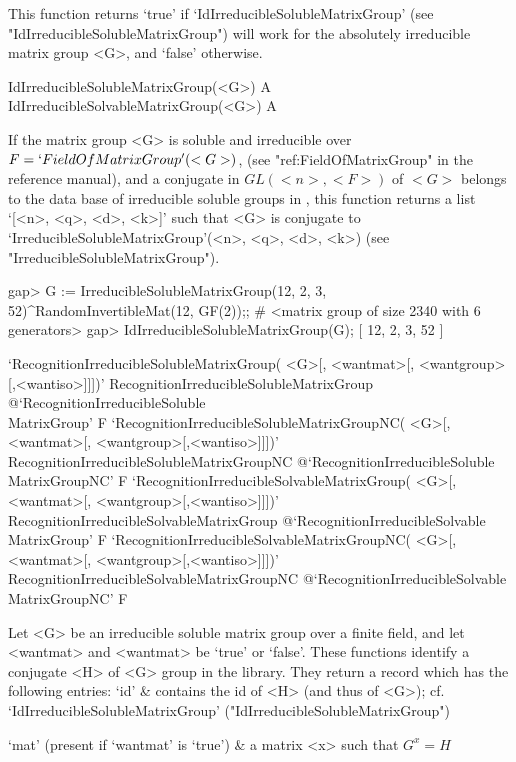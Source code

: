 This function returns `true' if `IdIrreducibleSolubleMatrixGroup' (see
"IdIrreducibleSolubleMatrixGroup") will work for the absolutely irreducible matrix group <G>, and `false' otherwise.


\>IdIrreducibleSolubleMatrixGroup(<G>) A
\>IdIrreducibleSolvableMatrixGroup(<G>) A

If the matrix group <G> is soluble and irreducible over $F
= `FieldOfMatrixGroup'(<G>)$, (see "ref:FieldOfMatrixGroup" in the {\GAP} reference manual), and a conjugate in
$GL(<n>, <F>)$ of $<G>$ belongs to the data base of  irreducible soluble groups in
{\IRREDSOL}, this function returns a list `[<n>, <q>, <d>, <k>]' such that <G> is
conjugate to  `IrreducibleSolubleMatrixGroup'(<n>, <q>, <d>, <k>) (see
"IrreducibleSolubleMatrixGroup").

\beginexample
gap> G := IrreducibleSolubleMatrixGroup(12, 2, 3, 52)^RandomInvertibleMat(12, GF(2));;
# <matrix group of size 2340 with 6 generators>
gap> IdIrreducibleSolubleMatrixGroup(G);
[ 12, 2, 3, 52 ]
\endexample


\>`RecognitionIrreducibleSolubleMatrixGroup(%
   <G>[, <wantmat>[, <wantgroup>[,<wantiso>]]])'%
{RecognitionIrreducibleSolubleMatrixGroup}%
@{`RecognitionIrreducibleSoluble\\MatrixGroup'} F
\>`RecognitionIrreducibleSolubleMatrixGroupNC(%
   <G>[, <wantmat>[, <wantgroup>[,<wantiso>]]])'%
{RecognitionIrreducibleSolubleMatrixGroupNC}%
@{`RecognitionIrreducibleSoluble\\MatrixGroupNC'} F
\>`RecognitionIrreducibleSolvableMatrixGroup(%
   <G>[, <wantmat>[, <wantgroup>[,<wantiso>]]])'%
{RecognitionIrreducibleSolvableMatrixGroup}%
@{`RecognitionIrreducibleSolvable\\MatrixGroup'} F
\>`RecognitionIrreducibleSolvableMatrixGroupNC(%
   <G>[, <wantmat>[, <wantgroup>[,<wantiso>]]])'%
{RecognitionIrreducibleSolvableMatrixGroupNC}%
@{`RecognitionIrreducibleSolvable\\MatrixGroupNC'} F

Let <G> be an irreducible soluble matrix group over a finite field, and let
<wantmat> and <wantmat> be `true' or `false'. 
These functions identify a conjugate <H> of <G> group in the library. 
They return a record which has the following entries:
\beginitems
`id' &  contains the id of <H> (and thus of <G>); 
    cf. `IdIrreducibleSolubleMatrixGroup'  ("IdIrreducibleSolubleMatrixGroup")

`mat' (present if `wantmat' is `true') &
    a matrix <x> such that $G^x = H$

